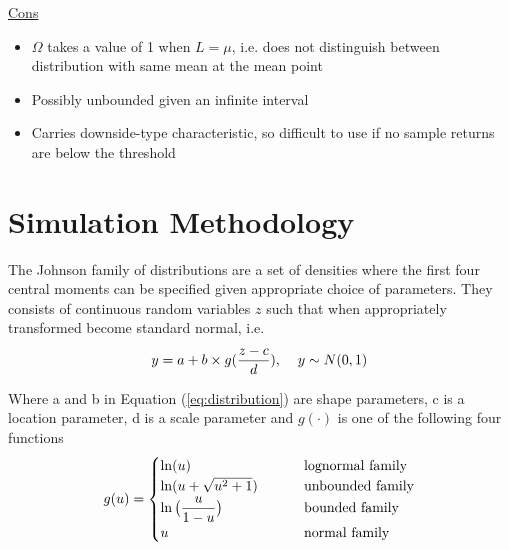 \documentclass{beamer}
\begin{document}
\begin{frame}
\underline{Cons}
\begin{itemize}
\item $\Omega$ takes a value of 1 when $L = \mu$, i.e. does not distinguish between distribution with same mean at the mean point
\item Possibly unbounded given an infinite interval
\item Carries downside-type characteristic, so difficult to use if no sample returns are below the threshold
\end{itemize}
\end{frame}

\section{Simulation Methodology}

\begin{frame}
The Johnson family of distributions\cite{johnson1949} are a set of densities where the first four central moments can be specified given appropriate choice of parameters. They consists of continuous random variables $z$ such that when appropriately transformed become standard normal\cite{simonato2011}, i.e.
\begin{align}
y = a + b \times g(\dfrac{z-c}{d}), \hspace{4mm} y \sim N(0,1)
\label{eq:distribution}
\end{align} 

Where a and b in Equation (\ref{eq:distribution}) are shape parameters, c is a location parameter, d is a scale parameter and $g(\cdot)$ is one of the following four functions
\begin{align}
g(u) = 
\begin{cases}
\ln(u) \hspace{25mm} &\text{lognormal family}\\
\ln(u + \sqrt{u^2+1}) &\text{unbounded family}\\
\ln\big(\dfrac{u}{1-u}\big) &\text{bounded family}\\
u &\text{normal family}
\end{cases}
\label{eq:Cases}
\end{align}
\end{frame}
\end{document}
